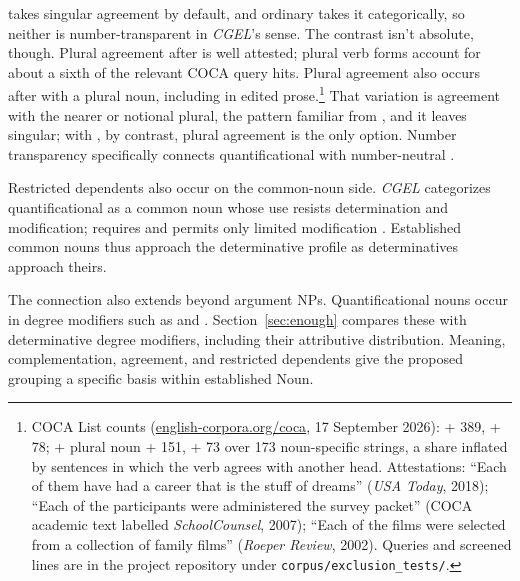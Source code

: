 \documentclass[12pt]{article}
\begin{document}
 takes singular agreement by default, and ordinary  takes it categorically, so neither is number-transparent in \textit{CGEL}'s sense. The contrast isn't absolute, though. Plural agreement after  is well attested; plural verb forms account for about a sixth of the relevant COCA query hits. Plural agreement also occurs after  with a plural noun, including in edited prose.\footnote{COCA List counts (\href{https://www.english-corpora.org/coca/}{english-corpora.org/coca}, 17 September 2026):  +  389, +  78;  + plural noun +  151, +  73 over 173 noun-specific strings, a share inflated by sentences in which the verb agrees with another head. Attestations: \enquote{Each of them have had a career that is the stuff of dreams} (\textit{USA Today}, 2018); \enquote{Each of the participants were administered the survey packet} (COCA academic text labelled \textit{SchoolCounsel}, 2007); \enquote{Each of the films were selected from a collection of family films} (\textit{Roeper Review}, 2002). Queries and screened lines are in the project repository under \texttt{corpus/exclusion\_tests/}.} That variation is agreement with the nearer or notional plural, the pattern familiar from , and it leaves  singular; with , by contrast, plural agreement is the only option. Number transparency specifically connects quantificational  with number-neutral .

Restricted dependents also occur on the common-noun side. \textit{CGEL} categorizes quantificational  as a common noun whose use resists determination and modification;  requires  and permits only limited modification \citep[349--350]{huddleston2002}. Established common nouns thus approach the determinative profile as determinatives approach theirs.

The connection also extends beyond argument NPs. Quantificational nouns occur in degree modifiers such as  and  \citep[549--550]{huddleston2002}. Section~\ref{sec:enough} compares these with determinative degree modifiers, including their attributive distribution. Meaning, complementation, agreement, and restricted dependents give the proposed grouping a specific basis within established Noun.
\end{document}
